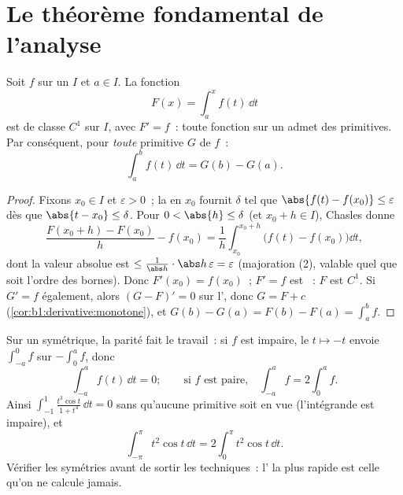\section{Le théorème fondamental de l'analyse}

\begin{theorem}\label{thm:b1:integration:ftc}
Soit $f$  sur un  $I$ et $a \in I$. La fonction
\[
F(x) = \int_a^x f(t)\, \dd t
\]
est de classe $C^1$ sur $I$, avec $F' = f$~: toute fonction 
sur un  admet des primitives. Par conséquent, pour
\emph{toute} primitive $G$ de $f$~:
\[
\int_a^b f(t)\,\dd t = G(b) - G(a) .
\]
\end{theorem}

\begin{proof}
Fixons $x_0 \in I$ et $\varepsilon > 0$~; la  en $x_0$
fournit $\delta$ tel que $\abs{f(t) - f(x_0)} \leq \varepsilon$ dès
que $\abs{t - x_0} \leq \delta$. Pour $0 < \abs{h} \leq \delta$ (et
$x_0 + h \in I$), Chasles donne
\[
\frac{F(x_0 + h) - F(x_0)}{h} - f(x_0)
= \frac 1h \int_{x_0}^{x_0+h} \bigl(f(t) - f(x_0)\bigr)\dd t ,
\]
dont la valeur absolue est $\leq \frac{1}{\abs h}\cdot \abs h\,
\varepsilon = \varepsilon$ (majoration (2), valable quel que soit
l'ordre des bornes). Donc $F'(x_0) = f(x_0)$~; $F' = f$ est
~: $F$ est $C^1$. Si $G' = f$ également, alors $(G - F)' = 0$
sur l', donc $G = F + c$
(\cref{cor:b1:derivative:monotone}), et $G(b) - G(a) = F(b) - F(a) =
\int_a^b f$.
\end{proof}

\begin{example}\label{ex:b1:integration:parity}
Sur un  symétrique, la parité fait le travail~: si $f$
est impaire, le  $t \mapsto -t$ envoie
$\int_{-a}^{0} f$ sur $-\int_0^a f$, donc
\[
\int_{-a}^{a} f(t)\,\dd t = 0 ;
\qquad\text{si $f$ est paire,}\quad
\int_{-a}^{a} f = 2\int_0^a f .
\]
Ainsi $\int_{-1}^{1} \frac{t^3\cos t}{1 + t^4}\,\dd t = 0$ sans
qu'aucune primitive soit en vue (l'intégrande est impaire), et
\[
\int_{-\pi}^{\pi} t^2\cos t\,\dd t = 2\int_0^\pi t^2\cos t\,
\dd t .
\]
Vérifier les symétries avant de sortir les techniques~:
l' la plus rapide est celle qu'on ne calcule jamais.
\end{example}


